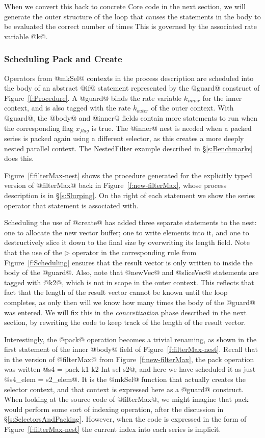 When we convert this back to concrete Core code in the next section, we will generate the outer structure of the loop that causes the statements in the body to be evaluated the correct number of times This is governed by the associated rate variable @k@. 


\subsubsection{Scheduling Pack and Create}
\label{s:SchedulingPacks}
Operators from @mkSel@ contexts in the process description are scheduled into the body of an abstract @if@ statement represented by the @guard@ construct of Figure~\ref{f:Procedure}. A @guard@ binds the rate variable $k_{inner}$ for the inner context, and is also tagged with the rate $k_{outer}$ of the outer context. With @guard@, the @body@ and @inner@ fields contain more statements to run when the corresponding flag $x_{flag}$ is true. The @inner@ nest is needed when a packed series is packed again using a different selector, as this creates a more deeply nested parallel context. The NestedFilter example described in \S\ref{s:Benchmarks} does this.

Figure~\ref{f:filterMax-nest} shows the procedure generated for the explicitly typed version of @filterMax@ back in Figure~\ref{f:new-filterMax}, whose process description is in \S\ref{s:Slurping}. On the right of each statement we show the series operator that statement is associated with. 

Scheduling the use of @create@ has added three separate statements to the nest: one to allocate the new vector buffer; one to write elements into it, and one to destructively slice it down to the final size by overwriting its length field. Note that the use of the $\rhd$ operator in the corresponding rule from Figure~\ref{f:Scheduling} ensures that the result vector is only written to inside the body of the @guard@. Also, note that @newVec@ and @sliceVec@ statements are tagged with @k2@, which is not in scope in the outer context. This reflects that fact that the length of the result vector cannot be known until the loop completes, as only then will we know how many times the body of the @guard@ was entered. We will fix this in the \emph{concretization} phase described in the next section, by rewriting the code to keep track of the length of the result vector.

Interestingly, the @pack@ operation becomes a trivial renaming, as shown in the first statement of the inner @body@ field of Figure~\ref{f:filterMax-nest}. Recall that in the version of @filterMax@ from Figure~\ref{f:new-filterMax}, the pack operation was written @s4 = pack k1 k2 Int sel s2@, and here we have scheduled it as just @s4_elem = s2_elem@. It is the @mkSel@ function that actually creates the selector context, and that context is expressed here as a @guard@ construct. When looking at the source code of @filterMax@, we might imagine that pack would perform some sort of indexing operation, after the discussion in \S\ref{s:SelectorsAndPacking}. However, when the code is expressed in the form of Figure~\ref{f:filterMax-nest} the current index into each series is implicit. 

